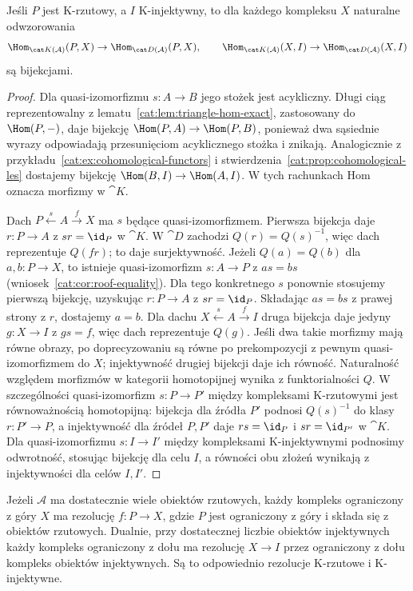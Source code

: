 \begin{twierdzenie}\label{cat:thm:k-projective-hom}
Jeśli $P$ jest K-rzutowy, a $I$ K-injektywny, to dla każdego kompleksu $X$ naturalne odwzorowania
\[
 \Hom_{\cat K(\mathcal A)}(P,X)\to\Hom_{\cat D(\mathcal A)}(P,X),
 \qquad
 \Hom_{\cat K(\mathcal A)}(X,I)\to\Hom_{\cat D(\mathcal A)}(X,I)
\]
są bijekcjami.
\end{twierdzenie}
\begin{proof}
Dla quasi-izomorfizmu $s:A\to B$ jego stożek jest acykliczny. Długi ciąg reprezentowalny z lematu~\ref{cat:lem:triangle-hom-exact}, zastosowany do $\Hom(P,-)$, daje bijekcję $\Hom(P,A)\to\Hom(P,B)$, ponieważ dwa sąsiednie wyrazy odpowiadają przesunięciom acyklicznego stożka i znikają. Analogicznie z przykładu~\ref{cat:ex:cohomological-functors} i stwierdzenia~\ref{cat:prop:cohomological-les} dostajemy bijekcję $\Hom(B,I)\to\Hom(A,I)$. W tych rachunkach Hom oznacza morfizmy w $\cat K$.

Dach $P\xleftarrow{s}A\xrightarrow f X$ ma $s$ będące quasi-izomorfizmem. Pierwsza bijekcja daje $r:P\to A$ z $sr=\id_P$ w $\cat K$. W $\cat D$ zachodzi $Q(r)=Q(s)^{-1}$, więc dach reprezentuje $Q(fr)$; to daje surjektywność. Jeżeli $Q(a)=Q(b)$ dla $a,b:P\to X$, to istnieje quasi-izomorfizm $s:A\to P$ z $as=bs$ (wniosek~\ref{cat:cor:roof-equality}). Dla tego konkretnego $s$ ponownie stosujemy pierwszą bijekcję, uzyskując $r:P\to A$ z $sr=\id_P$. Składając $as=bs$ z prawej strony z $r$, dostajemy $a=b$. Dla dachu $X\xleftarrow{s}A\xrightarrow f I$ druga bijekcja daje jedyny $g:X\to I$ z $gs=f$, więc dach reprezentuje $Q(g)$. Jeśli dwa takie morfizmy mają równe obrazy, po doprecyzowaniu są równe po prekompozycji z pewnym quasi-izomorfizmem do $X$; injektywność drugiej bijekcji daje ich równość. Naturalność względem morfizmów w kategorii homotopijnej wynika z funktorialności $Q$. W szczególności quasi-izomorfizm $s:P\to P'$ między kompleksami K-rzutowymi jest równoważnością homotopijną: bijekcja dla źródła $P'$ podnosi $Q(s)^{-1}$ do klasy $r:P'\to P$, a injektywność dla źródeł $P,P'$ daje $rs=\id_P$ i $sr=\id_{P'}$ w $\cat K$. Dla quasi-izomorfizmu $s:I\to I'$ między kompleksami K-injektywnymi podnosimy odwrotność, stosując bijekcję dla celu $I$, a równości obu złożeń wynikają z injektywności dla celów $I,I'$.
\end{proof}
\begin{twierdzenie}\label{cat:thm:bounded-complex-resolution}
Jeżeli $\mathcal A$ ma dostatecznie wiele obiektów rzutowych, każdy kompleks ograniczony z góry $X$ ma rezolucję $f:P\to X$, gdzie $P$ jest ograniczony z góry i składa się z obiektów rzutowych. Dualnie, przy dostatecznej liczbie obiektów injektywnych każdy kompleks ograniczony z dołu ma rezolucję $X\to I$ przez ograniczony z dołu kompleks obiektów injektywnych. Są to odpowiednio rezolucje K-rzutowe i K-injektywne.
\end{twierdzenie}
